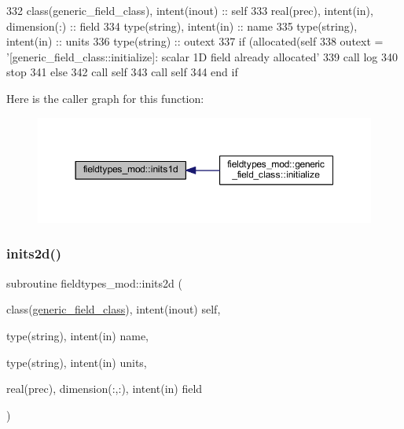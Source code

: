 \begin{DoxyCode}
332     \textcolor{keywordtype}{class}(generic\_field\_class), \textcolor{keywordtype}{intent(inout)} :: self
333     \textcolor{keywordtype}{real(prec)}, \textcolor{keywordtype}{intent(in)}, \textcolor{keywordtype}{dimension(:)} :: field
334     \textcolor{keywordtype}{type}(string), \textcolor{keywordtype}{intent(in)} :: name
335     \textcolor{keywordtype}{type}(string), \textcolor{keywordtype}{intent(in)} :: units
336     \textcolor{keywordtype}{type}(string) :: outext
337     \textcolor{keywordflow}{if} (\textcolor{keyword}{allocated}(self%
338         outext = \textcolor{stringliteral}{'[generic\_field\_class::initialize]: scalar 1D field already allocated'}
339         \textcolor{keyword}{call }log%
340         stop
341     \textcolor{keywordflow}{else}
342         \textcolor{keyword}{call }self%
343         \textcolor{keyword}{call }self%
344 \textcolor{keywordflow}{    end if}
\end{DoxyCode}
Here is the caller graph for this function\+:\nopagebreak
\begin{figure}[H]
\begin{center}
\leavevmode
\includegraphics[width=350pt]{namespacefieldtypes__mod_a3f1571ad15733a3f2fff43e35f309416_icgraph}
\end{center}
\end{figure}
\mbox{\label{namespacefieldtypes__mod_ad3329e97ec60bf9226d19be45ed21859}} 
\subsubsection{\texorpdfstring{inits2d()}{inits2d()}}
{\footnotesize\ttfamily subroutine fieldtypes\+\_\+mod\+::inits2d (\begin{DoxyParamCaption}\item[{class(\mbox{\hyperlink{structfieldtypes__mod_1_1generic__field__class}{generic\+\_\+field\+\_\+class}}), intent(inout)}]{self,  }\item[{type(string), intent(in)}]{name,  }\item[{type(string), intent(in)}]{units,  }\item[{real(prec), dimension(\+:,\+:), intent(in)}]{field }\end{DoxyParamCaption})\hspace{0.3cm}{\ttfamily [private]}}



